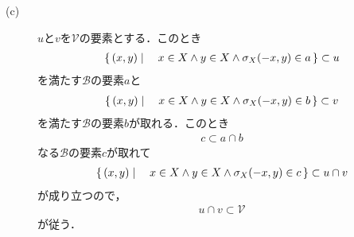 \begin{sketch}
\begin{description}
		\item[(c)] $u$と$v$を$\mathscr{V}$の要素とする．このとき
			\begin{align}
				\left\{\, (x,y) \mid \quad x \in X \wedge y \in X \wedge \sigma_X(-x,y) \in a\, \right\} \subset u
			\end{align}
			を満たす$\mathscr{B}$の要素$a$と
			\begin{align}
				\left\{\, (x,y) \mid \quad x \in X \wedge y \in X \wedge \sigma_X(-x,y) \in b\, \right\} \subset v
			\end{align}
			を満たす$\mathscr{B}$の要素$b$が取れる．このとき
			\begin{align}
				c \subset a \cap b
			\end{align}
			なる$\mathscr{B}$の要素$c$が取れて
			\begin{align}
				\left\{\, (x,y) \mid \quad x \in X \wedge y \in X \wedge \sigma_X(-x,y) \in c\, \right\} \subset u \cap v
			\end{align}
			が成り立つので，
			\begin{align}
				u \cap v \subset \mathscr{V}
			\end{align}
			が従う．
			

\end{description}
\end{sketch}
